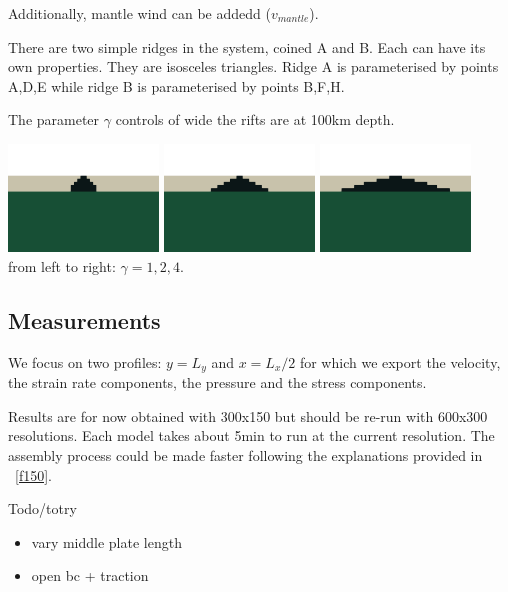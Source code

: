 Additionally, mantle wind can be addedd ($v_{mantle}$). 

There are two simple ridges in the system, coined A and B. Each can have its own properties.
They are isosceles triangles. Ridge A is parameterised by points A,D,E while 
ridge B is parameterised by points B,F,H.

The parameter $\gamma$ controls of wide the rifts are at 100km depth.
\begin{center}
\includegraphics[width=4cm]{python_codes/fieldstone_148/results/gamma1}
\includegraphics[width=4cm]{python_codes/fieldstone_148/results/gamma2}
\includegraphics[width=4cm]{python_codes/fieldstone_148/results/gamma4}\\
{\captionfont from left to right: $\gamma=1,2,4$.}
\end{center}

\subsection*{Measurements}
We focus on two profiles: $y=L_y$ and $x=L_x/2$ for which we export the velocity, 
the strain rate components, the pressure and the stress components.

Results are for now obtained with 300x150 but should be re-run with 600x300 resolutions.
Each model takes about 5min to run at the current resolution. 
The assembly process could be made faster following the explanations provided in \stone~\ref{f150}.

Todo/totry
\begin{itemize}
\item vary middle plate length
\item open bc + traction
\end{itemize}

